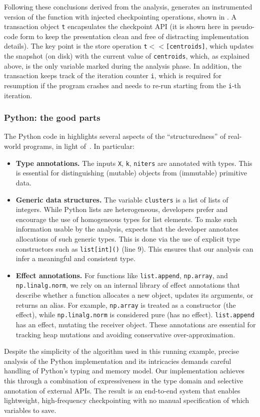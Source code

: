 Following these conclusions derived from the analysis, \spyte generates an instrumented version of the function
with injected checkpointing operations, shown in .
A transaction object \lstinline|t| encapsulates the checkpoint API (it is shown here in pseudo-code form to keep the presentation clean and free of distracting implementation details).
The key point is the store operation \lstinline|t|$<\!<$\lstinline|[centroids]|, which updates the snapshot (on disk) with the current value of \lstinline|centroids|, which,
as explained above, is the only variable marked during the analysis phase.
In addition, the transaction keeps track of the iteration counter \lstinline|i|, which is required for resumption if the program crashes and needs to re-run starting from the \lstinline|i|-th iteration.


\subsubsection*{Python: the good parts}

The Python code in  highlights
several aspects of the ``structuredness'' of real-world 
programs, in light of~\citet{bence2021unambiguity}.
In particular:
\begin{itemize}
  \item \textbf{Type annotations.} The inputs \lstinline|X|, \lstinline|k|, \lstinline|niters| are annotated with types.
This is essential for distinguishing (mutable) objects from (immutable) primitive data.
  \item \textbf{Generic data structures.} The variable \texttt{clusters} is a list of lists of integers. 
While Python lists are heterogeneous, developers prefer and encourage the use of homogeneous types for list elements.
To make such information usable by the analysis, \spyte
expects that the developer annotates allocations of such
generic types.
This is done via the use of explicit type constructors
such as \texttt{list[int]()} (line 9).
This ensures that our analysis can infer a meaningful and consistent type.
    \item \textbf{Effect annotations.} For functions like \lstinline|list.append|, \lstinline|np.array|, and \lstinline|np.linalg.norm|, we rely on an internal library of effect annotations that describe whether a function allocates a new object, updates its arguments, or returns an alias.
For example, \lstinline|np.array| is treated as a constructor (the \tnew effect), while \lstinline|np.linalg.norm| is considered pure (has no effect).
\lstinline|list.append| has an \tupdate effect, mutating the receiver object.
These annotations are essential for tracking heap mutations and avoiding conservative over-approximation.
\end{itemize}

Despite the simplicity of the algorithm used in this running example, precise analysis of the Python implementation and its intricacies demands careful handling of Python's typing and memory model.
Our implementation achieves this through a combination of expressiveness in the type domain and selective annotation of external APIs. The result is an end-to-end system that enables lightweight, high-frequency checkpointing with no manual specification of which variables to save.
